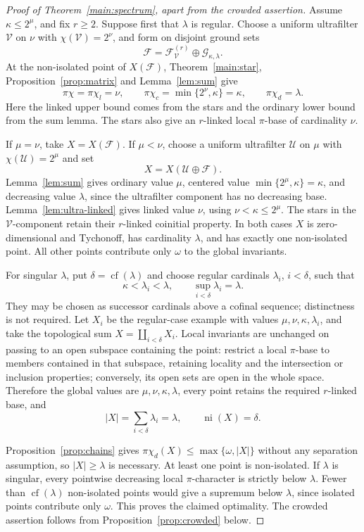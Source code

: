 \documentclass[11pt,a4paper]{amsart}
\theoremstyle{definition}
\theoremstyle{remark}
\newcommand{\U}{\mathcal U}
\newcommand{\F}{\mathcal F}
\newcommand{\G}{\mathcal G}
\newcommand{\pc}{\pi\chi}
\newcommand{\pcl}{\pi\chi_l}
\newcommand{\pcc}{\pi\chi_c}
\newcommand{\pcd}{\pi\chi_d}
\DeclareMathOperator{\cf}{cf}
\DeclareMathOperator{\niso}{ni}
\begin{document}
\begin{proof}[Proof of Theorem~\ref{main:spectrum}, apart from the crowded assertion]
Assume $\kappa\leqslant2^\mu$, and fix $r\geqslant2$. Suppose first that $\lambda$ is regular. Choose a uniform ultrafilter $\mathcal V$ on $\nu$ with $\chi(\mathcal V)=2^\nu$, and form on disjoint ground sets
\[
\F=\F_{\mathcal V}^{(r)}\oplus\G_{\kappa,\lambda}.
\]
At the non-isolated point of $X(\F)$, Theorem~\ref{main:star}, Proposition~\ref{prop:matrix} and Lemma~\ref{lem:sum} give
\[
\pc=\pcl=\nu,\qquad\pcc=\min\{2^\nu,\kappa\}=\kappa,
\qquad\pcd=\lambda.
\]
Here the linked upper bound comes from the stars and the ordinary lower bound from the sum lemma. The stars also give an $r$-linked local $\pi$-base of cardinality $\nu$.

If $\mu=\nu$, take $X=X(\F)$. If $\mu<\nu$, choose a uniform ultrafilter $\U$ on $\mu$ with $\chi(\U)=2^\mu$ and set
\[
X=X(\U\oplus\F).
\]
Lemma~\ref{lem:sum} gives ordinary value $\mu$, centered value $\min\{2^\mu,\kappa\}=\kappa$, and decreasing value $\lambda$, since the ultrafilter component has no decreasing base. Lemma~\ref{lem:ultra-linked} gives linked value $\nu$, using $\nu<\kappa\leqslant2^\mu$. The stars in the $\mathcal V$-component retain their $r$-linked coinitial property. In both cases $X$ is zero-dimensional and Tychonoff, has cardinality $\lambda$, and has exactly one non-isolated point. All other points contribute only $\omega$ to the global invariants.

For singular $\lambda$, put $\delta=\cf(\lambda)$ and choose regular cardinals $\lambda_i$, $i<\delta$, such that
\[
\kappa<\lambda_i<\lambda,\qquad\sup_{i<\delta}\lambda_i=\lambda.
\]
They may be chosen as successor cardinals above a cofinal sequence; distinctness is not required. Let $X_i$ be the regular-case example with values $\mu,\nu,\kappa,\lambda_i$, and take the topological sum $X=\coprod_{i<\delta}X_i$. Local invariants are unchanged on passing to an open subspace containing the point: restrict a local $\pi$-base to members contained in that subspace, retaining locality and the intersection or inclusion properties; conversely, its open sets are open in the whole space. Therefore the global values are $\mu,\nu,\kappa,\lambda$, every point retains the required $r$-linked base, and
\[
|X|=\sum_{i<\delta}\lambda_i=\lambda,\qquad\niso(X)=\delta.
\]

Proposition~\ref{prop:chains} gives $\pcd(X)\leqslant\max\{\omega,|X|\}$ without any separation assumption, so $|X|\geqslant\lambda$ is necessary. At least one point is non-isolated. If $\lambda$ is singular, every pointwise decreasing local $\pi$-character is strictly below $\lambda$. Fewer than $\cf(\lambda)$ non-isolated points would give a supremum below $\lambda$, since isolated points contribute only $\omega$. This proves the claimed optimality. The crowded assertion follows from Proposition~\ref{prop:crowded} below.
\end{proof}
\end{document}
